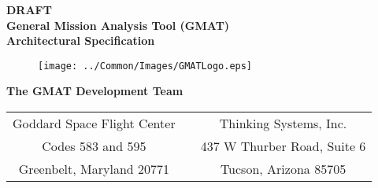 \thispagestyle{empty}
\begin{center}
{\renewcommand{\thefootnote}{\fnsymbol{footnote}} { \huge \bf DRAFT
\\General Mission Analysis Tool (GMAT)\\ Architectural Specification\\}
\vspace{0.1in} }
\end{center}

\begin{figure}[htbp!]
    \begin{center}
    \texttt{[image: ../Common/Images/GMATLogo.eps]}
    \end{center}
\end{figure}

\begin{center}
{\Large \bf The GMAT Development Team}\\
\vspace{0.1in}
\begin{tabular}{c c c}
  Goddard Space Flight Center & & Thinking Systems, Inc. \\
  Codes 583 and 595 & \hspace{0.3in} & 437 W Thurber Road, Suite 6 \\
  Greenbelt, Maryland 20771 & & Tucson, Arizona 85705 \\
\end{tabular}

\vspace{0.1in}{\today}

\end{center}

\clearpage \clearpage

